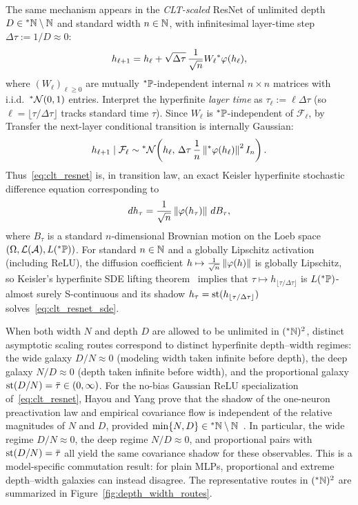 The same mechanism appears in the \emph{CLT-scaled} ResNet of unlimited depth $D \in {}^*\mathbb{N} \setminus \mathbb{N}$ and standard width $n \in \mathbb{N}$, with infinitesimal layer-time step $\Delta\tau := 1/D \approx 0$:
\begin{equation}\label{eq:clt_resnet}
h_{\ell+1} = h_\ell + \sqrt{\Delta\tau}\,\frac{1}{\sqrt{n}} W_\ell {}^*\varphi(h_\ell),
\end{equation}
where $(W_\ell)_{\ell \ge 0}$ are mutually ${}^*\mathbb{P}$-independent internal $n \times n$ matrices with i.i.d.\ ${}^*\mathcal{N}(0, 1)$ entries. Interpret the hyperfinite \emph{layer time} as $\tau_\ell := \ell\Delta\tau$ (so $\ell = \lfloor \tau/\Delta\tau \rfloor$ tracks standard time $\tau$). Since $W_\ell$ is ${}^*\mathbb{P}$-independent of $\mathcal{F}_\ell$, by Transfer the next-layer conditional transition is internally Gaussian:
\begin{equation}\label{eq:clt_resnet_transition}
h_{\ell+1} \mid \mathcal{F}_\ell \sim {}^*\mathcal{N}\!\left(h_\ell,\, \Delta\tau\,\frac{1}{n}\left\lVert {}^*\varphi(h_\ell) \right\rVert^2 I_n\right).
\end{equation}
Thus~\eqref{eq:clt_resnet} is, in transition law, an exact Keisler hyperfinite stochastic difference equation corresponding to
\begin{equation}\label{eq:clt_resnet_sde}
dh_\tau = \frac{1}{\sqrt{n}} \left\lVert \varphi(h_\tau) \right\rVert\,dB_\tau,
\end{equation}
where $B_\tau$ is a standard $n$-dimensional Brownian motion on the Loeb space $(\Omega, \mathcal{L}(\mathcal{A}), L({}^*\mathbb{P}))$. For standard $n \in \mathbb{N}$ and a globally Lipschitz activation (including ReLU), the diffusion coefficient $h \mapsto \frac{1}{\sqrt{n}}\left\lVert \varphi(h) \right\rVert$ is globally Lipschitz, so Keisler's hyperfinite SDE lifting theorem~\cite{keisler1984infinitesimal} implies that $\tau \mapsto h_{\lfloor \tau/\Delta\tau \rfloor}$ is $L({}^*\mathbb{P})$-almost surely S-continuous and its shadow $h_\tau = \operatorname{st}(h_{\lfloor \tau/\Delta\tau \rfloor})$ solves~\eqref{eq:clt_resnet_sde}.

When both width $N$ and depth $D$ are allowed to be unlimited in $({}^*\mathbb{N})^2$, distinct asymptotic scaling routes correspond to distinct hyperfinite depth--width regimes: the wide galaxy $D/N \approx 0$ (modeling width taken infinite before depth), the deep galaxy $N/D \approx 0$ (depth taken infinite before width), and the proportional galaxy $\operatorname{st}(D/N) = \bar{\tau} \in (0, \infty)$. For the no-bias Gaussian ReLU specialization of~\eqref{eq:clt_resnet}, Hayou and Yang prove that the shadow of the one-neuron preactivation law and empirical covariance flow is independent of the relative magnitudes of $N$ and $D$, provided $\min\{N, D\} \in {}^*\mathbb{N} \setminus \mathbb{N}$~\cite[Theorems~1 and~2]{hayou2023width}. In particular, the wide regime $D/N \approx 0$, the deep regime $N/D \approx 0$, and proportional pairs with $\operatorname{st}(D/N) = \bar{\tau}$ all yield the same covariance shadow for these observables. This is a model-specific commutation result: for plain MLPs, proportional and extreme depth--width galaxies can instead disagree. The representative routes in $({}^*\mathbb{N})^2$ are summarized in Figure~\ref{fig:depth_width_routes}.

